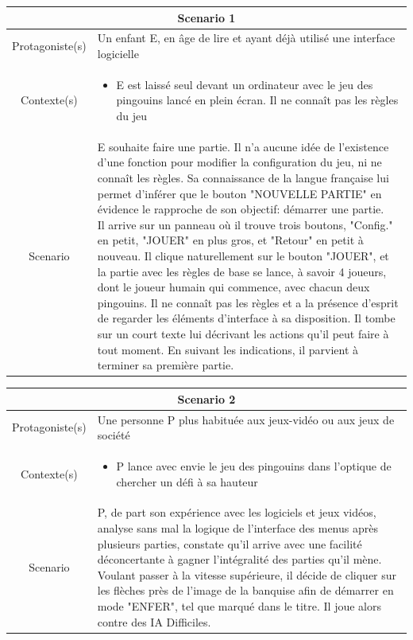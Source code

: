 \documentclass{report}
\begin{document}
\begin{tabular}{|c|l|}
 \hline
 \multicolumn{2}{|c|}{Scenario 1}\\
 \hline
 Protagoniste(s) & Un enfant E, en âge de lire et ayant déjà utilisé une interface logicielle \\
 \hline
 Contexte(s) & \parbox{13cm} {\begin{itemize}
 	\item E est laissé seul devant un ordinateur avec le jeu des pingouins lancé en plein écran. Il ne connaît pas les règles du jeu
\end{itemize} }\\
 \hline
 Scenario & \parbox{13cm}{ E souhaite faire une partie. Il n'a aucune idée de l'existence d'une fonction pour modifier la configuration du jeu, ni ne connaît les règles. Sa connaissance de la langue française lui permet d'inférer que le bouton "NOUVELLE PARTIE" en évidence le rapproche de son objectif: démarrer une partie. \\
 Il arrive sur un panneau où il trouve trois boutons, "Config." en petit, "JOUER" en plus gros, et "Retour" en petit à nouveau. Il clique naturellement sur le bouton "JOUER", et la partie avec les règles de base se lance, à savoir 4 joueurs, dont le joueur humain qui commence, avec chacun deux pingouins. Il ne connaît pas les règles et a la présence d'esprit de regarder les éléments d'interface à sa disposition. Il tombe sur un court texte lui décrivant les actions qu'il peut faire à tout moment. En suivant les indications, il parvient à terminer sa première partie.} \\
 \hline
 \end{tabular}

\vspace{0.4cm} 
 
  \begin{tabular}{|c|l|}
  \hline
 \multicolumn{2}{|c|}{Scenario 2}\\
 \hline
 Protagoniste(s) & Une personne P plus habituée aux jeux-vidéo ou aux jeux de société \\
 \hline
 Contexte(s) & \parbox{13cm} {\begin{itemize}
 	\item P lance avec envie le jeu des pingouins dans l'optique de chercher un défi à sa hauteur
\end{itemize} }\\
 \hline
 Scenario & \parbox{13cm}{ P, de part son expérience avec les logiciels et jeux vidéos, analyse sans mal la logique de l'interface des menus après plusieurs parties, constate qu'il arrive avec une facilité déconcertante à gagner l'intégralité des parties qu'il mène. Voulant passer à la vitesse supérieure, il décide de cliquer sur les flèches près de l'image de la banquise afin de démarrer en mode "ENFER", tel que marqué dans le titre. Il joue alors contre des IA Difficiles.} \\
 \hline
 \end{tabular}
 
\end{document}
